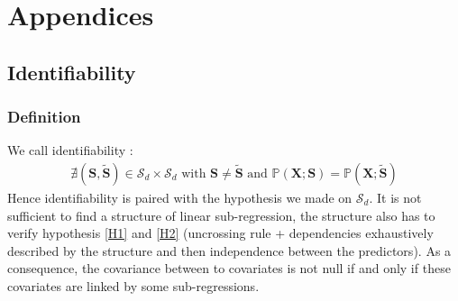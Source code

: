 \documentclass[12pt,a4paper]{report}
\begin{document}

%

%		
%		
%		
%		
%		
%			
\chapter{Appendices}

	\section{Identifiability}\label{sectionident}
		\subsection{Definition}
		We call identifiability :
\begin{eqnarray}
	\nexists (\boldsymbol{S},\tilde{\boldsymbol{S}}) \in \mathcal{S}_d\times \mathcal{S}_d \textrm{ with } \boldsymbol{S} \neq \tilde{\boldsymbol{S}} \textrm{ and }
	\mathbb{P}(\boldsymbol{X};\boldsymbol{S})=\mathbb{P}(\boldsymbol{X};\tilde{\boldsymbol{S}})
 \end{eqnarray}
	Hence identifiability is paired with the hypothesis we made on $ \mathcal{S}_d$. It is not sufficient to find a structure of linear sub-regression, the structure also has to verify hypothesis \ref{H1} and \ref{H2} (uncrossing rule + dependencies exhaustively described by the structure and then independence between the predictors). As a consequence, the covariance between to covariates is not null if and only if these covariates are linked by some sub-regressions.
 
\end{document}
